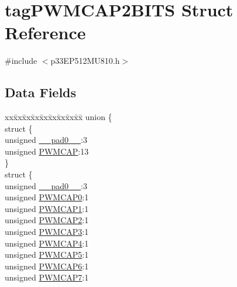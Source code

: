 \hypertarget{structtag_p_w_m_c_a_p2_b_i_t_s}{}\section{tag\+P\+W\+M\+C\+A\+P2\+B\+I\+TS Struct Reference}
\label{structtag_p_w_m_c_a_p2_b_i_t_s}


{\ttfamily \#include $<$p33\+E\+P512\+M\+U810.\+h$>$}

\subsection*{Data Fields}
\begin{DoxyCompactItemize}
\item 
\begin{tabbing}
xx\=xx\=xx\=xx\=xx\=xx\=xx\=xx\=xx\=\kill
union \{\\
\>struct \{\\
\>\>unsigned \hyperlink{structtag_p_w_m_c_a_p2_b_i_t_s_adf71f3d8410c1f1dbbc96680a92c49af}{\_\_pad0\_\_}:3\\
\>\>unsigned \hyperlink{structtag_p_w_m_c_a_p2_b_i_t_s_a3877a5299772d03214ef452994c53979}{PWMCAP}:13\\
\>\} \\
\>struct \{\\
\>\>unsigned \hyperlink{structtag_p_w_m_c_a_p2_b_i_t_s_adf71f3d8410c1f1dbbc96680a92c49af}{\_\_pad0\_\_}:3\\
\>\>unsigned \hyperlink{structtag_p_w_m_c_a_p2_b_i_t_s_a34c685289d01ac79a9b067b945e411b0}{PWMCAP0}:1\\
\>\>unsigned \hyperlink{structtag_p_w_m_c_a_p2_b_i_t_s_a4c90f0d96eece06b7d6c7e41e394b417}{PWMCAP1}:1\\
\>\>unsigned \hyperlink{structtag_p_w_m_c_a_p2_b_i_t_s_a2111a4368f6512c24cf193f6c83672e3}{PWMCAP2}:1\\
\>\>unsigned \hyperlink{structtag_p_w_m_c_a_p2_b_i_t_s_a5d3e7376fc29096ef98492e81f73590d}{PWMCAP3}:1\\
\>\>unsigned \hyperlink{structtag_p_w_m_c_a_p2_b_i_t_s_a07f7fb680f8c9bdd5d3c94a84a30a7b5}{PWMCAP4}:1\\
\>\>unsigned \hyperlink{structtag_p_w_m_c_a_p2_b_i_t_s_a434b71ab2093a53faf535c8f27973f7b}{PWMCAP5}:1\\
\>\>unsigned \hyperlink{structtag_p_w_m_c_a_p2_b_i_t_s_a4249adbed71df183d967bd51f8d811fa}{PWMCAP6}:1\\
\>\>unsigned \hyperlink{structtag_p_w_m_c_a_p2_b_i_t_s_a282c7ae90ac64b1a78eb1351a7d0eee0}{PWMCAP7}:1\\

\end{tabbing}
\end{DoxyCompactItemize}
